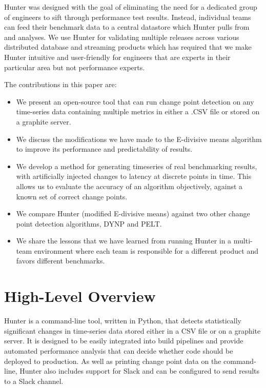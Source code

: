 \documentclass[sigconf]{acmart}
\begin{document}
Hunter was designed with the goal of eliminating the need for a dedicated group of engineers to sift through performance test results. Instead, individual teams can feed their benchmark data to a central datastore which Hunter pulls from and analyses. We use Hunter for validating multiple releases across various distributed database and streaming products which has required that we make Hunter intuitive and user-friendly for engineers that are experts in their particular area but not performance experts.

The contributions in this paper are:

\begin{itemize}
\item We present an open-source tool that can run change point detection on any time-series data containing multiple metrics in either a .CSV file or stored on a graphite server.
\item We discuss the modifications we have made to the E-divisive means algorithm to improve its performance and predictability of results.
\item We develop a method for generating timeseries of real benchmarking results, with artificially injected changes to latency at discrete points in time. This allows us to evaluate the accuracy of an algorithm objectively, against a known set of correct change points.
\item We compare Hunter (modified E-divisive means) against two other change point detection algorithms, DYNP and PELT.
\item We share the lessons that we have learned from running Hunter in a multi-team environment where each team is responsible for a different product and favors different benchmarks.
\end{itemize}

\section{High-Level Overview}
Hunter is a command-line tool, written in Python, that detects statistically significant changes in time-series data stored either in a CSV file or on a graphite server. It is designed to be easily integrated into build pipelines \cite{CONTINUOUSBENCHMARKING} and provide automated performance analysis that can decide whether code should be deployed to production. As well as printing change point data on the command-line, Hunter also includes support for Slack and can be configured to send results to a Slack channel.
\end{document}
